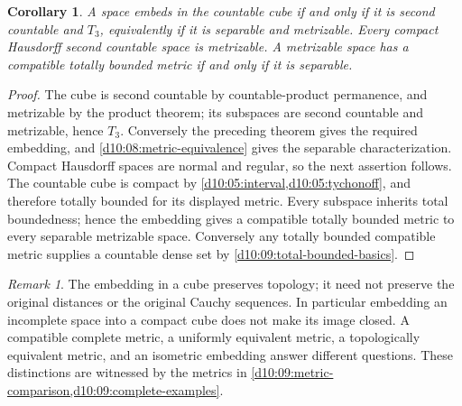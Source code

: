 \documentclass[11pt,oneside,openany]{book}
\newtheorem{corollary}[theorem]{Corollary}
\theoremstyle{definition}
\theoremstyle{remark}
\newtheorem{remark}[theorem]{Remark}
\begin{document}
\begin{corollary}\label{d10:10:hilbert-cube-universal}
A space embeds in the countable cube if and only if it is second countable and $T_3$, equivalently if it is separable and metrizable. Every compact Hausdorff second countable space is metrizable. A metrizable space has a compatible totally bounded metric if and only if it is separable.
\end{corollary}
\begin{proof}
The cube is second countable by countable-product permanence, and metrizable by the product theorem; its subspaces are second countable and metrizable, hence $T_3$. Conversely the preceding theorem gives the required embedding, and \cref{d10:08:metric-equivalence} gives the separable characterization. Compact Hausdorff spaces are normal and regular, so the next assertion follows. The countable cube is compact by \cref{d10:05:interval,d10:05:tychonoff}, and therefore totally bounded for its displayed metric. Every subspace inherits total boundedness; hence the embedding gives a compatible totally bounded metric to every separable metrizable space. Conversely any totally bounded compatible metric supplies a countable dense set by \cref{d10:09:total-bounded-basics}.
\end{proof}

\begin{remark}\label{d10:10:embedding-distances}
The embedding in a cube preserves topology; it need not preserve the original distances or the original Cauchy sequences. In particular embedding an incomplete space into a compact cube does not make its image closed. A compatible complete metric, a uniformly equivalent metric, a topologically equivalent metric, and an isometric embedding answer different questions. These distinctions are witnessed by the metrics in \cref{d10:09:metric-comparison,d10:09:complete-examples}.
\end{remark}
\end{document}
